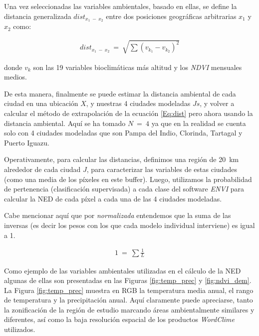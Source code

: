   \par Una vez seleccionadas las variables ambientales, basado en ellas, se
    define la distancia generalizada $dist_{x_{1}\ -\ x_{2}}$ entre dos
    posiciones geográficas arbitrarias $x_{1}$ y $x_{2}$ como:

    \begin{align}
      dist_{x_{1}\ -\ x_{2}} \ =\ \sqrt{\sum{}{(v_{k_{1}} - v_{k_{2}})^{2}}}
    \end{align}

    donde $v_{k}$ son las 19 variables bioclimáticas más altitud y los
    \textit{NDVI} mensuales medios.

  \par De esta manera, finalmente se puede estimar la distancia ambiental de
    cada ciudad en una ubicación $X$, y nuestras 4 ciudades modeladas
    $Js$, y volver a calcular el método de extrapolación de la ecuación \ref{Eq:dist}
    pero ahora usando la distancia ambiental. Aquí se ha tomado $N\ =\ 4$ ya
    que en la realidad se cuenta solo con 4 ciudades modeladas que son
    Pampa del Indio, Clorinda, Tartagal y Puerto Iguazu.


  \par Operativamente, para calcular las distancias, definimos una región de
    \SI{20}{\kilo\meter} alrededor de cada ciudad $J$, para caracterizar las
    variables de estas ciudades (como una media de los píxeles en este buffer).
    Luego, utilizamos la probabilidad de pertenencia (clasificación supervisada)
    a cada clase del software \textit{ENVI} para calcular la NED de cada píxel
    a cada una de las 4 ciudades modeladas.

  \par Cabe mencionar aquí que por \textit{normalizada} entendemos que la
    suma de las inversas (es decir los pesos con los que cada modelo
    individual interviene) es igual a 1.

  \begin{align}
    1\ =\ \sum{}{\frac{1}{L}}
  \end{align}


  \par Como ejemplo de las variables ambientales utilizadas en el cálculo de
    la NED algunas de ellas son presentadas en las Figuras \ref{fig:temp_prec}
    y \ref{fig:ndvi_dem}.
    La Figura \ref{fig:temp_prec} muestra en RGB la temperatura media anual,
    el rango de temperatura y la precipitación anual. Aquí claramente puede
    apreciarse, tanto la zonificación de la región de estudio marcando áreas
    ambientalmente similares y diferentes, así como la baja resolución espacial
    de los productos \textit{WordClime} utilizados.

